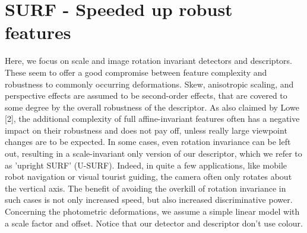 \section{SURF - Speeded up robust features}
Here, we focus on scale and image rotation invariant detectors and
descriptors. These seem to offer a good compromise between feature complexity
and robustness to commonly occurring deformations. Skew, anisotropic scaling,
and perspective effects are assumed to be second-order effects, that are
covered to some degree by the overall robustness of the descriptor. As also
claimed by Lowe [2], the additional complexity of full affine-invariant
features often has a negative impact on their robustness and does not pay off,
unless really large viewpoint changes are to be expected. In some cases, even
rotation invariance can be left out, resulting in a scale-invariant only
version of our descriptor, which we refer to as ’upright SURF’
(U-SURF). Indeed, in quite a few applications, like mobile robot navigation or
visual tourist guiding, the camera often only rotates about the vertical
axis. The benefit of avoiding the overkill of rotation invariance in such cases
is not only increased speed, but also increased discriminative
power. Concerning the photometric deformations, we assume a simple linear model
with a scale factor and offset. Notice that our detector and descriptor don’t use colour.
